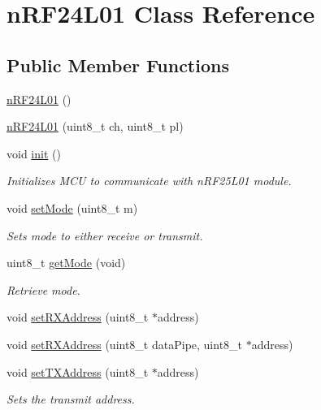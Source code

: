 \hypertarget{classn_r_f24_l01}{\section{n\-R\-F24\-L01 Class Reference}
\label{classn_r_f24_l01}
}
\subsection*{Public Member Functions}
\begin{DoxyCompactItemize}
\item 
\hyperlink{classn_r_f24_l01_a4392a317b65252b3d620a6c557f5f148}{n\-R\-F24\-L01} ()
\item 
\hyperlink{classn_r_f24_l01_aa436e2da2244f8b76c102683272d5fa8}{n\-R\-F24\-L01} (uint8\-\_\-t ch, uint8\-\_\-t pl)
\item 
void \hyperlink{classn_r_f24_l01_a46c2fc5ad6598ededbecdbcb2cee5209}{init} ()
\begin{DoxyCompactList}\small\item\em Initializes M\-C\-U to communicate with n\-R\-F25\-L01 module. \end{DoxyCompactList}\item 
void \hyperlink{classn_r_f24_l01_a3f658b56f150311dc6a2836876deee06}{set\-Mode} (uint8\-\_\-t m)
\begin{DoxyCompactList}\small\item\em Sets mode to either receive or transmit. \end{DoxyCompactList}\item 
uint8\-\_\-t \hyperlink{classn_r_f24_l01_ab4f950b967293baae91196fcb8e5a3c4}{get\-Mode} (void)
\begin{DoxyCompactList}\small\item\em Retrieve mode. \end{DoxyCompactList}\item 
void \hyperlink{classn_r_f24_l01_a225b0e2e380f86d846b96af343c3380b}{set\-R\-X\-Address} (uint8\-\_\-t $\ast$address)
\item 
void \hyperlink{classn_r_f24_l01_abf3f5c8e5f7f8f409eec13056be56b7a}{set\-R\-X\-Address} (uint8\-\_\-t data\-Pipe, uint8\-\_\-t $\ast$address)
\item 
void \hyperlink{classn_r_f24_l01_adcbfc14dcdbfc5d7ef840a471e41f91c}{set\-T\-X\-Address} (uint8\-\_\-t $\ast$address)
\begin{DoxyCompactList}\small\item\em Sets the transmit address. \end{DoxyCompactList}\item 

\end{DoxyCompactItemize}
